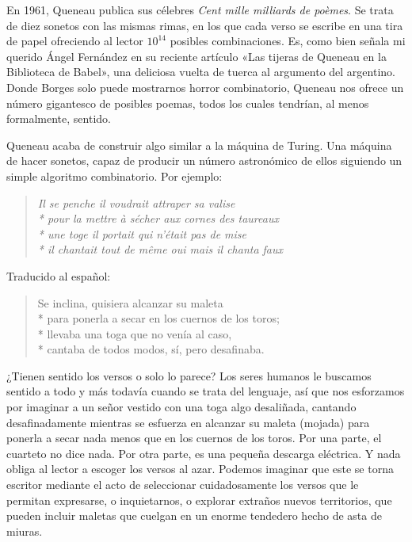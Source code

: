 \documentclass[11pt,a4paper]{article}
\begin{document}
En 1961, Queneau publica sus célebres
\emph{Cent mille milliards de poèmes}. Se trata de diez sonetos con las mismas rimas, en los que cada verso se escribe en una tira de papel ofreciendo al lector $10^{14}$ posibles combinaciones. Es, como bien señala mi querido Ángel Fernández en su reciente artículo «Las tijeras de Queneau en la Biblioteca de Babel», una deliciosa vuelta de tuerca al argumento del argentino. Donde Borges solo puede mostrarnos horror combinatorio, Queneau nos ofrece un número gigantesco de posibles poemas, todos los cuales tendrían, al menos formalmente, sentido.

Queneau acaba de construir algo similar a la máquina de Turing. Una máquina de hacer sonetos, capaz de producir un número astronómico de ellos siguiendo un simple algoritmo combinatorio. Por ejemplo: 


\begin{verse}
\itshape
Il se penche il voudrait attraper sa valise\\*
pour la mettre à sécher aux cornes des taureaux\\*
une toge il portait qui n’était pas de mise\\*
il chantait tout de même oui mais il chanta faux
\end{verse}

Traducido al español:

\begin{verse}
Se inclina, quisiera alcanzar su maleta\\*
para ponerla a secar en los cuernos de los toros;\\*
llevaba una toga que no venía al caso,\\*
cantaba de todos modos, sí, pero desafinaba.
\end{verse}

¿Tienen sentido los versos o solo lo parece? Los seres humanos le buscamos sentido a todo y más todavía cuando se trata del lenguaje, así que nos esforzamos por imaginar a un señor vestido con una toga algo desaliñada, cantando desafinadamente mientras se esfuerza en alcanzar su maleta (mojada) para ponerla a secar nada menos que en los cuernos de los toros. Por una parte, el cuarteto no dice nada. Por otra parte, es una pequeña descarga eléctrica. Y nada obliga al lector a escoger los versos al azar. Podemos imaginar que este se torna escritor mediante el acto de seleccionar cuidadosamente los versos que le permitan expresarse, o inquietarnos, o explorar extraños nuevos territorios, que pueden incluir maletas que cuelgan en un enorme tendedero hecho de asta de miuras. 
\end{document}
